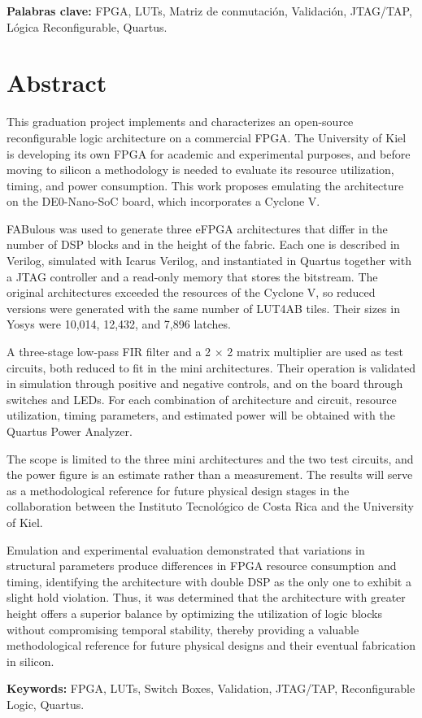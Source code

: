 \vspace{0.1cm}
\textbf{Palabras clave: } FPGA, LUTs, Matriz de conmutación, Validación, JTAG/TAP, Lógica Reconfigurable, Quartus.

\clearpage
\chapter*{Abstract}
\thispagestyle{empty}

This graduation project implements and characterizes an open-source reconfigurable logic architecture on a commercial FPGA. The University of Kiel is developing its own FPGA for academic and experimental purposes, and before moving to silicon a methodology is needed to evaluate its resource utilization, timing, and power consumption. This work proposes emulating the architecture on the DE0-Nano-SoC board, which incorporates a Cyclone V.

FABulous was used to generate three eFPGA architectures that differ in the number of DSP blocks and in the height of the fabric. Each one is described in Verilog, simulated with Icarus Verilog, and instantiated in Quartus together with a JTAG controller and a read-only memory that stores the bitstream. The original architectures exceeded the resources of the Cyclone V, so reduced versions were generated with the same number of LUT4AB tiles. Their sizes in Yosys were 10,014, 12,432, and 7,896 latches.

A three-stage low-pass FIR filter and a 2 × 2 matrix multiplier are used as test circuits, both reduced to fit in the mini architectures. Their operation is validated in simulation through positive and negative controls, and on the board through switches and LEDs. For each combination of architecture and circuit, resource utilization, timing parameters, and estimated power will be obtained with the Quartus Power Analyzer.

The scope is limited to the three mini architectures and the two test circuits, and the power figure is an estimate rather than a measurement. The results will serve as a methodological reference for future physical design stages in the collaboration between the Instituto Tecnológico de Costa Rica and the University of Kiel.

Emulation and experimental evaluation demonstrated that variations in structural parameters produce differences in FPGA resource consumption and timing, identifying the architecture with double DSP as the only one to exhibit a slight hold violation. Thus, it was determined that the architecture with greater height offers a superior balance by optimizing the utilization of logic blocks without compromising temporal stability, thereby providing a valuable methodological reference for future physical designs and their eventual fabrication in silicon.


\textbf{Keywords:}  FPGA, LUTs, Switch Boxes, Validation, JTAG/TAP, Reconfigurable Logic, Quartus.


